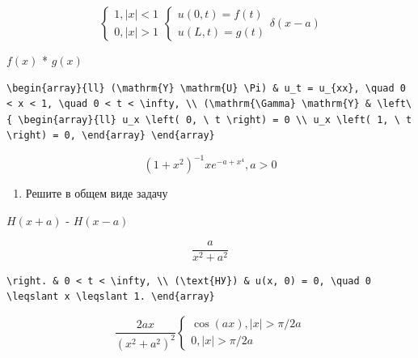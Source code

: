 \documentclass[
  ukrainian,
]{article}
\providecommand{\tightlist}{%
  \setlength{\itemsep}{0pt}\setlength{\parskip}{0pt}}
\begin{document}
\[
\begin{cases} 1, |x| < 1 \\ 0, |x| > 1 \end{cases}
\begin{cases} u(0, t) = f(t) \\ u(L, t) = g(t) \end{cases}
\delta(x-a)
\]

\(f(x)\) * \(g(x)\)

\begin{verbatim}
\begin{array}{ll} (\mathrm{Y} \mathrm{U} \Pi) & u_t = u_{xx}, \quad 0 < x < 1, \quad 0 < t < \infty, \\ (\mathrm{\Gamma} \mathrm{Y} & \left\{ \begin{array}{ll} u_x \left( 0, \ t \right) = 0 \\ u_x \left( 1, \ t \right) = 0, \end{array} \end{array}
\end{verbatim}

\[
(1+x^2)^{-1}
xe^{-a+x^4}, a > 0
\]

\begin{enumerate}
\def\labelenumi{\arabic{enumi}.}
\setcounter{enumi}{1}
\tightlist
\item
  Решите в общем виде задачу
\end{enumerate}

\(H(x+a)\) - \(H(x-a)\)

\[
\frac{a}{x^2+a^2}
\]

\begin{verbatim}
\right. & 0 < t < \infty, \\ (\text{НУ}) & u(x, 0) = 0, \quad 0 \leqslant x \leqslant 1. \end{array}
\end{verbatim}

\[
\frac{2ax}{(x^2+a^2)^2}
\begin{cases} \cos(ax), |x| > \pi/2a \\ 0, |x| > \pi/2a \end{cases}
\]
\end{document}
